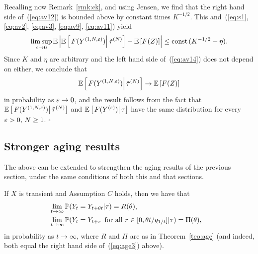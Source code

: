 Recalling now Remark~\ref{rmk:ck}, and using Jensen, we find that the right hand side of~(\ref{eq:av12}) is bounded above by constant times
$K^{-1/2}$.
This and~(\ref{eq:s1}, \ref{eq:av2}, \ref{eq:av3}, \ref{eq:av9}, \ref{eq:av11}) yield
\begin{equation}
\label{eq:av14}
\limsup_{\eps\to0}\esp\left|\esp\left[\left.F(\y1e)\right|\ttn\right]-\esp\left[F(Z)\right]\right|\leq\mbox{const}\,(K^{-1/2}+\eta).
\end{equation}
Since $K$ and $\eta$ are arbitrary and the left hand side of~(\ref{eq:av14}) does not depend on either, we conclude that
\begin{equation}
\label{eq:av15}
\esp\left[\left.F(\y1e)\right|\ttn\right]\to\esp\left[F(Z)\right]
\end{equation}
in probability as $\varepsilon\to0$, and the result follows from the fact that 
$\esp\left[\left.F(\y1e)\right|\ttn\right]$ and 
${\mathbb E}\left[\left.F(Y^{(\varepsilon)})\right|\tau\right]$ have the same distribution for every $\varepsilon>0,\, N\geq1$.
$\square$


\subsection{Stronger aging results}
\label{ssec:stra}

The above can be extended to strengthen the aging results of the previous section, under the same conditions of both this and that sections.

\begin{theo}
\label{teo:ages}
If $X$ is transient and Assumption $C$ holds, then we have that
\begin{eqnarray}
\label{eq:ages_r}
&\lim_{t\to\infty}\P(Y_t=Y_{t+\theta t}|\tau)=R(\theta),&\\
\label{eq:ages_pi}
&\lim_{t\to\infty}\P(Y_t=Y_{t+r}\,\mbox{ for all }r\in[0,\theta t/q_{1/t}]|\tau)=\Pi(\theta),&
\end{eqnarray}
in probability as $t\to\infty$, where $R$ and $\Pi$ are as in Theorem~\ref{teo:age} (and indeed, both equal the right hand side of~(\ref{eq:age3})
above).
\end{theo}




